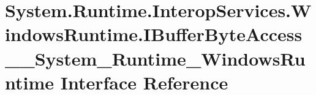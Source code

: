 \hypertarget{interface_system_1_1_runtime_1_1_interop_services_1_1_windows_runtime_1_1_i_buffer_byte_access__8aad8629c9e3be1462b5ca3f6b1769da}{}\section{System.\+Runtime.\+Interop\+Services.\+Windows\+Runtime.\+I\+Buffer\+Byte\+Access\+\_\+\+\_\+\+System\+\_\+\+Runtime\+\_\+\+Windows\+Runtime Interface Reference}
\label{interface_system_1_1_runtime_1_1_interop_services_1_1_windows_runtime_1_1_i_buffer_byte_access__8aad8629c9e3be1462b5ca3f6b1769da}
